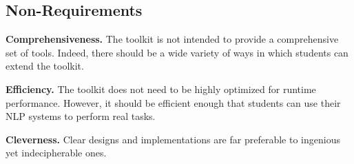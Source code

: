 \documentclass[11pt]{article}
\begin{document}
\subsection{Non-Requirements}

\noindent\textbf{Comprehensiveness.} The toolkit is not intended to
provide a comprehensive set of tools.  Indeed, there should be a wide
variety of ways in which students can extend the toolkit.

\noindent\textbf{Efficiency.} The toolkit does not need to be highly
optimized for runtime performance.  However, it should be efficient
enough that students can use their NLP systems to perform real tasks.

\noindent\textbf{Cleverness.} Clear designs and implementations are
far preferable to ingenious yet indecipherable ones.
\end{document}
